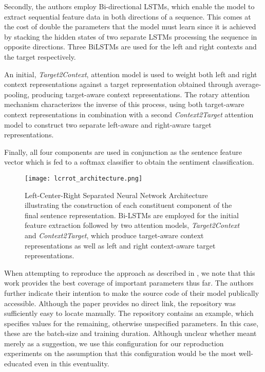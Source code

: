 \documentclass[../../fyp.tex]{subfiles}
\begin{document}
Secondly, the authors employ Bi-directional LSTMs, which enable the model to extract sequential feature data in both directions of a sequence. This comes at the cost of double the parameters that the model must learn since it is achieved by stacking the hidden states of two separate LSTMs processing the sequence in opposite directions. Three BiLSTMs are used for the left and right contexts and the target respectively. 

An initial, \textit{Target2Context}, attention model is used to weight both left and right context representations against a target representation obtained through average-pooling, producing target-aware context representations. The rotary attention mechanism characterizes the inverse of this process, using both target-aware context representations in combination with a second \textit{Context2Target} attention model to construct two separate left-aware and right-aware target representations. 

Finally, all four components are used in conjunction as the sentence feature vector which is fed to a softmax classifier to obtain the sentiment classification. 
\begin{figure}[!ht]
	\centering
	\texttt{[image: lcrrot\_architecture.png]}
	\caption{Left-Center-Right Separated Neural Network Architecture \cite{zheng2018} illustrating the construction of each constituent component of the final sentence representation. Bi-LSTMs are employed for the initial feature extraction followed by two attention models, \textit{Target2Context} and \textit{Context2Target}, which produce target-aware context representations as well as left and right context-aware target representations.}
	\label{fig:ffnn}
\end{figure}

When attempting to reproduce the approach as described in \cite{zheng2018}, we note that this work provides the best coverage of important parameters thus far. The authors further indicate their intention to make the source code of their model publically accessible. Although the paper provides no direct link, the repository was sufficiently easy to locate manually. The repository contains an example, which specifies values for the remaining, otherwise unspecified parameters. In this case, these are the batch-size and training duration. Although unclear whether meant merely as a suggestion, we use this configuration for our reproduction experiments on the assumption that this configuration would be the most well-educated even in this eventuality.   
\end{document}
